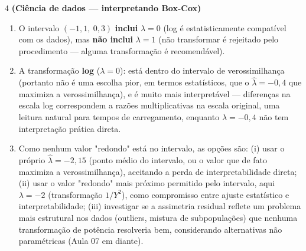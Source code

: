 \documentclass[11pt]{article}
\begin{document}
\begin{questao}{4} \textbf{(Ciência de dados --- interpretando Box-Cox)}
\end{questao}
\begin{solucao}
\begin{enumerate}[label=(\alph*)]
  \item O intervalo $(-1{,}1,\ 0{,}3)$ \textbf{inclui} $\lambda=0$ (log é estatisticamente
    compatível com os dados), mas \textbf{não inclui} $\lambda=1$ (não transformar é rejeitado
    pelo procedimento --- alguma transformação é recomendável).
  \item A transformação \textbf{log} ($\lambda=0$): está dentro do intervalo de verossimilhança
    (portanto não é uma escolha pior, em termos estatísticos, que o $\hat\lambda=-0{,}4$ que
    maximiza a verossimilhança), e é muito mais interpretável --- diferenças na escala log
    correspondem a razões multiplicativas na escala original, uma leitura natural para tempos de
    carregamento, enquanto $\lambda=-0{,}4$ não tem interpretação prática direta.
  \item Como nenhum valor "redondo" está no intervalo, as opções são: (i) usar o próprio
    $\hat\lambda=-2{,}15$ (ponto médio do intervalo, ou o valor que de fato maximiza a
    verossimilhança), aceitando a perda de interpretabilidade direta; (ii) usar o valor "redondo"
    mais próximo permitido pelo intervalo, aqui $\lambda=-2$ (transformação $1/Y^2$), como
    compromisso entre ajuste estatístico e interpretabilidade; (iii) investigar se a assimetria
    residual reflete um problema mais estrutural nos dados (outliers, mistura de subpopulações)
    que nenhuma transformação de potência resolveria bem, considerando alternativas não
    paramétricas (Aula 07 em diante).
\end{enumerate}
\end{solucao}
\end{document}
